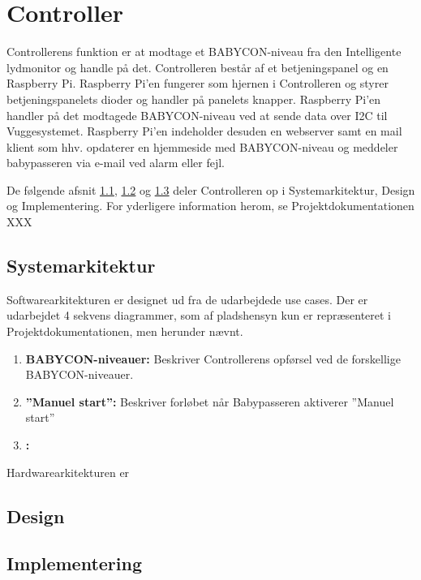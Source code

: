 \chapter{Controller}

Controllerens funktion er at modtage et BABYCON-niveau fra den Intelligente lydmonitor og handle på det. Controlleren består af et betjeningspanel og en Raspberry Pi. Raspberry Pi'en fungerer som hjernen i Controlleren og styrer betjeningspanelets dioder og handler på panelets knapper. Raspberry Pi'en handler på det modtagede BABYCON-niveau ved at sende data over I2C til Vuggesystemet. Raspberry Pi'en indeholder desuden en webserver samt en mail klient som hhv. opdaterer en hjemmeside med BABYCON-niveau og meddeler babypasseren via e-mail ved alarm eller fejl.

De følgende afsnit \ref{ctrl_sysark},   \ref{ctrl_design} og \ref{ctrl_implementering} deler Controlleren op i Systemarkitektur, Design og Implementering. For yderligere information herom, se Projektdokumentationen XXX

\section{Systemarkitektur}
\label{ctrl_sysark}

Softwarearkitekturen er designet ud fra de udarbejdede use cases. Der er udarbejdet 4 sekvens diagrammer, som af pladshensyn kun er repræsenteret i Projektdokumentationen, men herunder nævnt. 

\begin{enumerate}
\item \textbf{BABYCON-niveauer:} Beskriver Controllerens opførsel ved de forskellige BABYCON-niveauer.
\item \textbf{''Manuel start'':} Beskriver forløbet når Babypasseren aktiverer ''Manuel start''
\item \textbf{:} 
\end{enumerate}


Hardwarearkitekturen er 





\section{Design}
\label{ctrl_design}



\section{Implementering}
\label{ctrl_implementering}